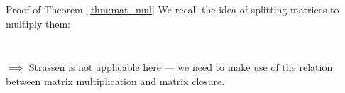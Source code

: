 \begin{frame}{Proof of Theorem~\ref{thm:mat_mul}}
    We recall the idea of splitting matrices to multiply them:

    \begin{columns}
        \begin{column}{.2\linewidth}
            \begin{figure}
            \end{figure}
        \end{column}
        \begin{column}{.2\linewidth}
            \begin{figure}
            \end{figure}
        \end{column}
    \end{columns}

    $\implies$ Strassen is not applicable here --- we need to make use of the relation between matrix multiplication and matrix closure.
\end{frame}

